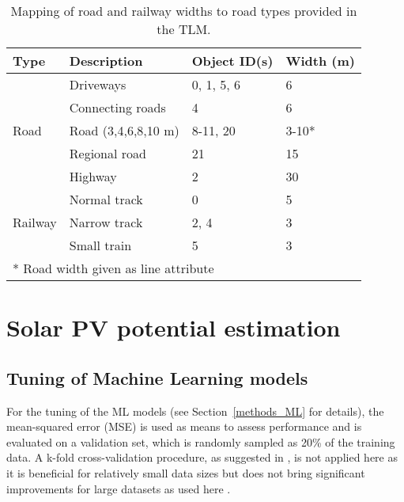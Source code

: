 \begin{table}[ht]
\centering
\footnotesize
\caption{Mapping of road and railway widths to road types provided in the TLM.}
\label{tab:roads}

\begin{tabular}{llll}
\hline
\textbf{Type}            & \textbf{Description}    & \textbf{Object ID(s) \cite{swisstopo_swisstlm3d_2018}} & \textbf{Width (m)} \\ \hline
\multirow{5}{*}{Road}    & Driveways           & 0, 1, 5, 6                      & 6                  \\
                         & Connecting roads    & 4                               & 6                  \\
                         & Road (3,4,6,8,10 m) & 8-11, 20                        & 3-10*              \\
                         & Regional road       & 21                              & 15                 \\
                         & Highway             & 2                               & 30                 \\ \hline
\multirow{3}{*}{Railway} & Normal track        & 0                               & 5                  \\
                         & Narrow track        & 2, 4                            & 3                  \\
                         & Small train         & 5                               & 3                  \\ \hline
\multicolumn{4}{l}{* Road width given as line attribute}                                             
\end{tabular}
\end{table}


\chapter{Solar PV potential estimation}

\section{Tuning of Machine Learning models}
\label{app:tuning}
%
For the tuning of the ML models (see Section~\ref{methods_ML} for details), the mean-squared error (MSE) is used as means to assess performance and is evaluated on a validation set, which is randomly sampled as 20\% of the training data. A k-fold cross-validation procedure, as suggested in \cite{leuenberger_extreme_2015}, is not applied here as it is beneficial for relatively small data sizes but does not bring significant improvements for large datasets as used here \cite{heskes_practical_1997}.

